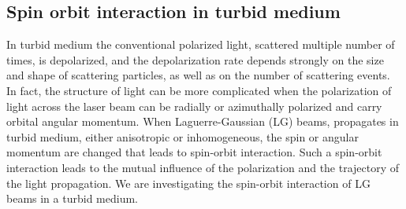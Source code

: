 \documentclass[13pt]{article}
\begin{document}
	\subsection{Spin orbit interaction in turbid medium}
	\par 
	In turbid medium the conventional polarized light, scattered multiple number of times, is depolarized, and the depolarization rate depends strongly on the size and shape of scattering particles, as well as on the number of scattering events. In fact, the structure of light can be more complicated when the polarization of light across the laser beam can be radially or azimuthally polarized and carry orbital angular momentum. When  Laguerre-Gaussian (LG) beams, propagates in turbid  medium, either anisotropic or inhomogeneous, the spin or angular momentum are changed that leads to spin-orbit interaction. Such a spin-orbit interaction leads to the mutual influence of the polarization and the trajectory of the light propagation. We are investigating the spin-orbit interaction of  LG beams in a turbid medium.
	
	\printbibliography
\end{document}

